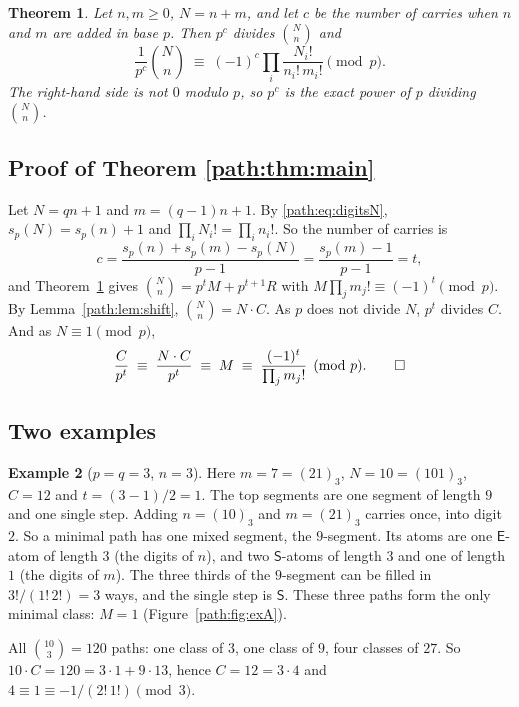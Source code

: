 \documentclass[11pt]{article}
\newtheorem{theorem}{Theorem}[section]
\theoremstyle{definition}
\newtheorem{example}[theorem]{Example}
\theoremstyle{remark}
\numberwithin{equation}{section}
\numberwithin{figure}{section}
\newcommand{\E}{\textsf{E}}
\newcommand{\Ss}{\textsf{S}}
\begin{document}
\begin{theorem}\label{path:thm:binom}
Let $n,m\ge0$, $N=n+m$, and let $c$ be the number of carries when $n$ and $m$ are added in base $p$. Then
$p^c$ divides $\binom Nn$ and
\[
\frac1{p^c}\binom Nn\;\equiv\;(-1)^c\prod_i\frac{N_i!}{n_i!\,m_i!}\pmod p .
\]
The right-hand side is not $0$ modulo $p$, so $p^c$ is the exact power of $p$ dividing $\binom Nn$.
\end{theorem}

\subsection{Proof of Theorem \ref{path:thm:main}}\label{path:sec:proof}

Let $N=qn+1$ and $m=(q-1)n+1$. By \eqref{path:eq:digitsN}, $s_p(N)=s_p(n)+1$ and $\prod_iN_i!=\prod_in_i!$. So the
number of carries is
\[
c=\frac{s_p(n)+s_p(m)-s_p(N)}{p-1}=\frac{s_p(m)-1}{p-1}=t ,
\]
and Theorem~\ref{path:thm:binom} gives $\binom Nn=p^tM+p^{t+1}R$ with $M\prod_jm_j!\equiv(-1)^t\pmod p$. By
Lemma~\ref{path:lem:shift}, $\binom Nn=N\cdot C$. As $p$ does not divide $N$, $p^t$ divides $C$. And as $N\equiv1\pmod p$,
\[
\frac C{p^t}\;\equiv\;\frac{N\cdot C}{p^t}\;\equiv\;M\;\equiv\;\frac{(-1)^t}{\prod_jm_j!}\pmod p. \qed
\]

\subsection{Two examples}

\begin{example}[$p=q=3$, $n=3$]\label{path:ex:A}
Here $m=7=(21)_3$, $N=10=(101)_3$, $C=12$ and $t=(3-1)/2=1$. The top segments are one segment of length $9$
and one single step. Adding $n=(10)_3$ and $m=(21)_3$ carries once, into digit $2$. So a minimal path has
one mixed segment, the $9$-segment. Its atoms are one $\E$-atom of length $3$ (the digits of $n$), and two
$\Ss$-atoms of length $3$ and one of length $1$ (the digits of $m$). The three thirds of the $9$-segment can be
filled in $3!/(1!\,2!)=3$ ways, and the single step is $\Ss$. These three paths form the only minimal class:
$M=1$ (Figure~\ref{path:fig:exA}).

All $\binom{10}3=120$ paths: one class of $3$, one class of $9$, four classes of $27$. So
$10\cdot C=120=3\cdot1+9\cdot13$, hence $C=12=3\cdot 4$ and $4\equiv1\equiv-1/(2!\,1!)\pmod 3$.
\end{example}
\end{document}
